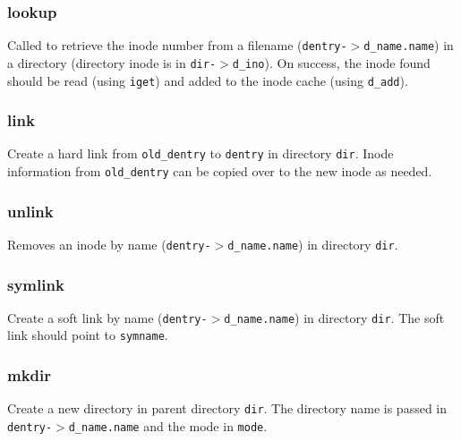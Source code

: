 \subsubsection{lookup}


Called to retrieve the inode number from a filename (\texttt{dentry-$>$d\_name.name}) in a directory (directory inode is in \texttt{dir-$>$d\_ino}). On success, the inode found should be read (using \texttt{iget}) and added to the inode cache (using \texttt{d\_add}).

\subsubsection{link}


Create a hard link from \texttt{old\_dentry} to \texttt{dentry} in directory \texttt{dir}. Inode information from \texttt{old\_dentry} can be copied over to the new inode as needed.

\subsubsection{unlink}


Removes an inode by name (\texttt{dentry-$>$d\_name.name}) in directory \texttt{dir}.

\subsubsection{symlink}


Create a soft link by name (\texttt{dentry-$>$d\_name.name}) in directory \texttt{dir}. The soft link should point to \texttt{symname}.

\subsubsection{mkdir}


Create a new directory in parent directory \texttt{dir}. The directory name is passed in \texttt{dentry-$>$d\_name.name} and the mode in \texttt{mode}.

